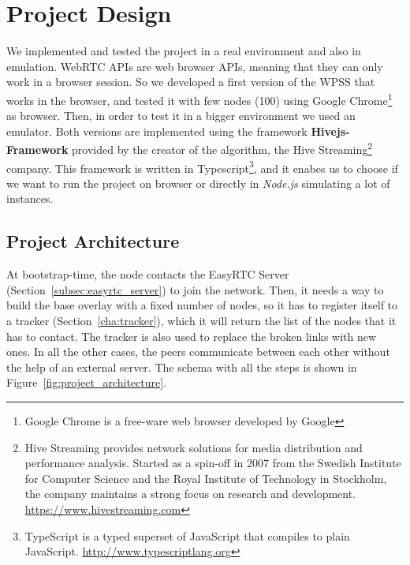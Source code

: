 \chapter{Project Design}
\label{cha:design}
We implemented and tested the project in a real environment and also in emulation. WebRTC APIs are web browser APIs, meaning that they can only work in a browser session. So we developed a first version of the \ac{WPSS} that works in the browser, and tested it with few nodes (100) using Google Chrome\footnote{Google Chrome is a free-ware web browser developed by Google} as browser. Then, in order to test it in a bigger environment we used an emulator. Both versions are implemented using the framework \textbf{Hivejs-Framework} provided by the creator of the algorithm, the Hive Streaming\footnote{Hive Streaming provides network solutions for media distribution and performance analysis. Started as a spin-off in 2007 from the Swedish Institute for Computer Science and the Royal Institute of Technology in Stockholm, the company maintains a strong focus on research and development. \url{https://www.hivestreaming.com}} company. This framework is written in Typescript\footnote{TypeScript is a typed superset of JavaScript that compiles to plain JavaScript. \url{http://www.typescriptlang.org}}, and it enabes us to choose if we want to run the project on browser or directly in \textit{Node.js} simulating a lot of instances.


\section{Project Architecture}
\label{sec:arch}
At bootstrap-time, the node contacts the EasyRTC Server (Section~\ref{subsec:easyrtc_server}) to join the network. Then, it needs a way to build the base overlay with a fixed number of nodes, so it has to register itself to a tracker (Section~\ref{cha:tracker}), which it will return the list of the nodes that it has to contact. The tracker is also used to replace the broken links with new ones. In all the other cases, the peers communicate between each other without the help of an external server. The schema with all the steps is shown in Figure~\ref{fig:project_architecture}.


